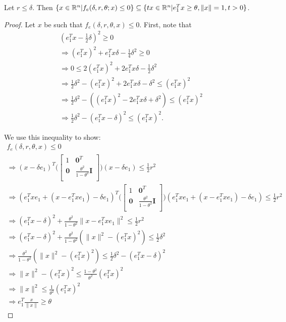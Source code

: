 \begin{theorem}
\label{ellipse_in_cone}
Let $r \le \delta$.
Then $\{x \in {\mathbb R^{n}} | f_e(\delta, r, \theta; x) \le 0\} \subseteq \{tx\in{\mathbb R^{n}}| e_1^T x \ge \theta,\|x\|=1, t>0\}$.
\end{theorem}


\begin{proof}
Let $x$ be such that $f_e(\delta, r, \theta, x) \le 0$.
First, note that
\begin{align*}
(e_1^Tx - \frac 1 2 \delta )^2\ge 0\\
\Longrightarrow (e_1^Tx)^2 + e_1^Tx\delta  - \frac 1 4 \delta^2 \ge 0\\
\Longrightarrow 0 \le 2(e_1^Tx)^2 + 2e_1^Tx\delta  - \frac 1 2 \delta^2\\
\Longrightarrow \frac 1 2 \delta^2 - (e_1^Tx)^2 + 2e_1^Tx\delta - \delta^2 \le (e_1^Tx)^2 \\
\Longrightarrow \frac 1 2 \delta^2 - \left((e_1^Tx)^2 - 2e_1^Tx\delta + \delta^2\right) \le (e_1^Tx)^2 \\
\Longrightarrow \frac 1 2 \delta^2 - (e_1^Tx - \delta)^2 \le (e_1^Tx)^2.
\end{align*}

We use this inequality to show:
\begin{align*}
f_e(\delta, r, \theta, x) \le 0 \\
\Longrightarrow (x - \delta e_1)^T\bigg(\begin{bmatrix}
1 & \boldsymbol0^T \\
\boldsymbol 0 & \frac{\theta^2}{1 - \theta^2} \boldsymbol I \\
\end{bmatrix}\bigg)(x - \delta e_1) \le \frac 1 2 r^2 \\
\Longrightarrow (e_1^Txe_1 + (x - e_1^Txe_1) - \delta e_1)^T\bigg(\begin{bmatrix}
1 & \boldsymbol0^T \\
\boldsymbol 0 & \frac{\theta^2}{1 - \theta^2} \boldsymbol I \\
\end{bmatrix}\bigg)(e_1^Txe_1 + (x - e_1^Txe_1) - \delta e_1) \le \frac 1 2 r^2 \\
\Longrightarrow
(e_1^Tx - \delta)^2 + \frac{\theta^2}{1 - \theta^2}\|x - e_1^Tx e_1\|^2 \le \frac 1 2 r^2 \\
\Longrightarrow
(e_1^Tx - \delta)^2 + \frac{\theta^2}{1 - \theta^2}(\|x\|^2 - (e_1^Tx)^2) \le \frac 1 2 \delta^2 \\
\Longrightarrow\frac{\theta^2}{1 - \theta^2}(\|x\|^2 - (e_1^Tx)^2) \le \frac 1 2 \delta^2 - (e_1^Tx - \delta)^2\\
\Longrightarrow\|x\|^2 - (e_1^Tx)^2 \le \frac{1 - \theta^2}{\theta^2}(e_1^Tx)^2 \\
\Longrightarrow\|x\|^2 \le \frac 1 {\theta^2}(e_1^Tx)^2 \\
\Longrightarrow e_1^T\frac{x}{\|x\|} \ge \theta
\end{align*}
\end{proof}

